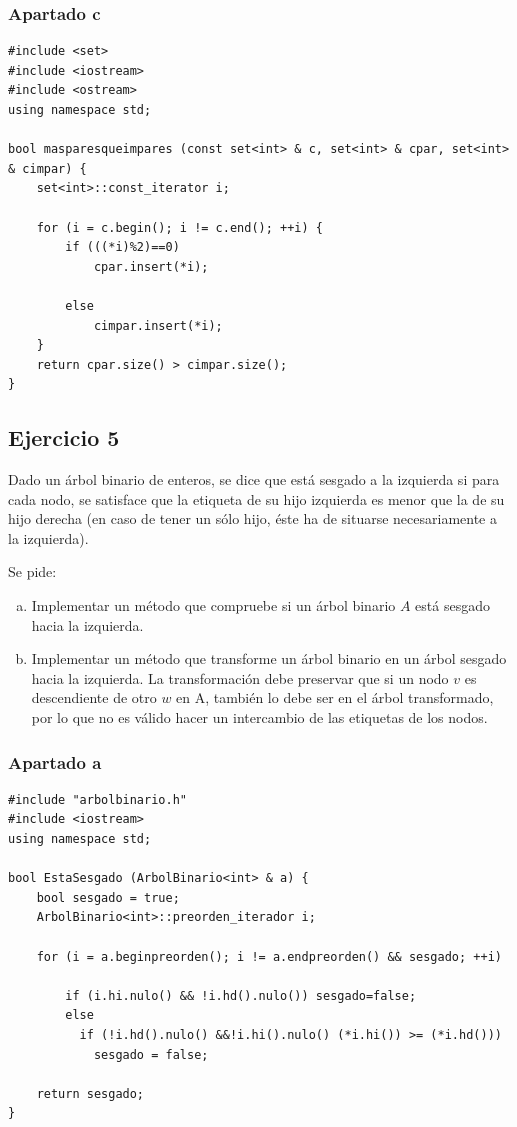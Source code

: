 \documentclass[10pt,a4paper,spanish]{report}
\begin{document}
\subsubsection{\textcolor[rgb]{0.5,0.8,1}Apartado c}

\begin{verbatim}
#include <set>
#include <iostream>
#include <ostream>
using namespace std;

bool masparesqueimpares (const set<int> & c, set<int> & cpar, set<int> & cimpar) {
    set<int>::const_iterator i;

    for (i = c.begin(); i != c.end(); ++i) {
        if (((*i)%2)==0)
            cpar.insert(*i);

        else
            cimpar.insert(*i);
    }
    return cpar.size() > cimpar.size();
}
\end{verbatim}

\subsection{\textcolor[rgb]{0.5,0.8,1}Ejercicio 5}
\noindent
Dado un árbol binario de enteros, se dice que está sesgado a la izquierda si para cada nodo, se satisface que la etiqueta de su hijo izquierda es menor que la de su hijo derecha (en caso de tener un sólo hijo, éste ha de situarse necesariamente a la izquierda).

\noindent
Se pide:
\begin{enumerate}[a)]
      \item Implementar un método que compruebe si un árbol binario $A$ está sesgado hacia la izquierda.
      \item Implementar un método que transforme un árbol binario en un árbol sesgado hacia la izquierda. La transformación debe preservar que si un nodo $v$ es descendiente de otro $w$ en A, también lo debe ser en el árbol transformado, por lo que no es válido hacer un intercambio de las etiquetas de los nodos.
\end{enumerate}

\subsubsection{\textcolor[rgb]{0.5,0.8,1}Apartado a}

\begin{verbatim}
#include "arbolbinario.h"
#include <iostream>
using namespace std;

bool EstaSesgado (ArbolBinario<int> & a) {
    bool sesgado = true;
    ArbolBinario<int>::preorden_iterador i;

    for (i = a.beginpreorden(); i != a.endpreorden() && sesgado; ++i)
        
        if (i.hi.nulo() && !i.hd().nulo()) sesgado=false;
        else
          if (!i.hd().nulo() &&!i.hi().nulo() (*i.hi()) >= (*i.hd()))
            sesgado = false;

    return sesgado;   
}
\end{verbatim}
\end{document}
